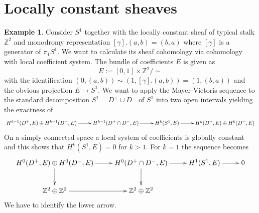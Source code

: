 \documentclass[10pt]{amsart}
\theoremstyle{definition}
\newtheorem{ex}[defn]{Example}
\theoremstyle{plain}
\theoremstyle{remark}
\newcommand{\ZZ}{\mathbb{Z}}
\newcommand{\union}{\cup}
\newcommand{\intersection}{\cap}
\begin{document}
\section*{Locally constant sheaves}

\begin{ex}\label{twistarsch}
Consider $S^1$ together with the locally constant sheaf of typical stalk $\ZZ^2$ and monodromy representation $[\gamma].(a,b)=(b,a)$ where $[\gamma]$ is a generator of $\pi_1S^1$. We want to calculate its sheaf cohomology via cohomology with local coefficient system. The bundle of coefficients $E$ is given as $$E:=[0,1]\times\ZZ^2/\sim$$ with the identification $(0,(a,b))\sim (1,[\gamma].(a,b))=(1,(b,a))$ and the obvious projection $E\to S^1$. We want to apply the Mayer-Vietoris sequence to the standard decomposition $S^1=D^+\union D^-$ of $S^1$ into two open intervals yielding the exactness of
\[\begin{xy}
  \xymatrix{
  H^{k-1}(D^+,E)\oplus H^{k-1}(D^-,E)\ar[r] & H^{k-1}(D^+\intersection D^-,E)\ar[r] & H^k(S^1,E)\ar[r] & H^k(D^+,E)\oplus H^k(D^-,E)
  } 
  \end{xy}\]
On a simply connected space a local system of coefficients is globally constant and this shows that $H^k(S^1,E)=0$ for $k>1$. For $k=1$ the sequence becomes
\begin{align}\label{arsch}
\begin{xy}
  \xymatrix{
  H^0(D^+,E)\oplus H^0(D^-,E)\ar[r]\ar[d] & H^0(D^+\intersection D^-,E)\ar[r]\ar[d] & H^1(S^1,E)\ar[r] & 0\\
  \ZZ^2\oplus\ZZ^2\ar[r] & \ZZ^2\oplus\ZZ^2 & &
  }
  \end{xy}
\end{align}
We have to identify the lower arrow.\newline
{}
\end{ex}
\end{document}
